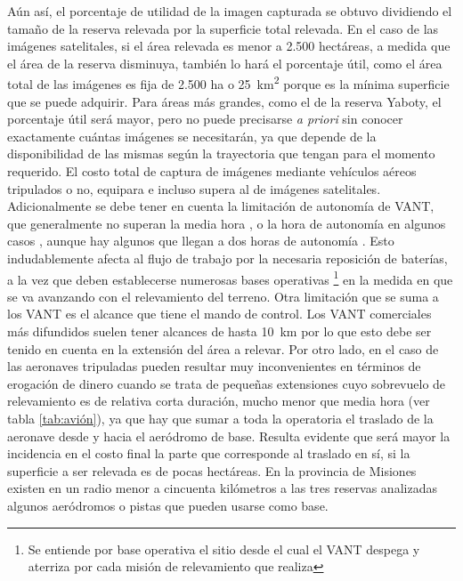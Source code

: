 Aún así, el porcentaje de utilidad de la imagen capturada se obtuvo dividiendo el tamaño de la reserva relevada por la superficie total relevada. En el caso de las imágenes satelitales, si el área relevada es menor a 2.500 hectáreas, a medida que el área de la reserva disminuya, también lo hará el porcentaje útil, como el área total de las imágenes es fija de 2.500 ha o \SI{25}{\kilo\metre\squared} porque es la mínima superficie que se puede adquirir. Para áreas más grandes, como el de la reserva Yaboty, el porcentaje útil será mayor, pero no puede precisarse \textit{a priori} sin conocer exactamente cuántas imágenes se necesitarán, ya que depende de la disponibilidad de las mismas según la trayectoria que tengan para el momento requerido. El costo total de captura de imágenes mediante vehículos aéreos tripulados o no, equipara e incluso supera al de imágenes satelitales. 
Adicionalmente se debe tener en cuenta la limitación de autonomía de VANT, que generalmente no superan la media hora \cite{noauthor_dji_nodate}, o la hora de autonomía en algunos casos \cite{noauthor_specs_nodate}, aunque hay algunos que llegan a dos horas de autonomía \cite{noauthor_us-1_nodate}. Esto indudablemente afecta al flujo de trabajo por la necesaria reposición de baterías, a la vez que deben establecerse numerosas bases operativas \footnote{Se entiende por base operativa el sitio desde el cual el VANT despega y aterriza por cada misión de relevamiento que realiza} en la medida en que se va avanzando con el relevamiento del terreno.
Otra limitación que se suma a los VANT es el alcance que tiene el mando de control. Los VANT comerciales más difundidos suelen tener alcances de hasta \SI{10}{\kilo\metre} \cite{noauthor_dji_nodate} por lo que esto debe ser tenido en cuenta en la extensión del área a relevar.
Por otro lado, en el caso de las aeronaves tripuladas pueden resultar muy inconvenientes en términos de erogación de dinero cuando se trata de pequeñas extensiones cuyo sobrevuelo de relevamiento es de relativa corta duración, mucho menor que media hora (ver tabla \ref{tab:avión}), ya que hay que sumar a toda la operatoria el traslado de la aeronave desde y hacia el aeródromo de base. Resulta evidente que será mayor la incidencia en el costo final la parte que corresponde al traslado en sí, si la superficie a ser relevada es de pocas hectáreas. En la provincia de Misiones existen en un radio menor a cincuenta kilómetros a las tres reservas analizadas algunos aeródromos o pistas que pueden usarse como base.
